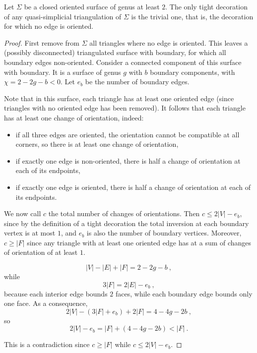 \documentclass[10pt,a4paper]{amsart}
\begin{document}
\begin{lemma}\label{lm:pak}
  Let $\Sigma$ be a closed oriented surface of genus at least $2$. The only tight decoration of any quasi-simplicial triangulation of $\Sigma$ is the trivial one, that is, the decoration for which no edge is oriented.
\end{lemma}

\begin{proof}
  First remove from $\Sigma$ all triangles where no edge is oriented. This leaves a (possibly disconnected) triangulated surface with boundary, for which all boundary edges non-oriented.  Consider a connected component of this surface with boundary. It is a surface of genus $g$ with $b$ boundary components, with $\chi=2-2g-b<0$. Let $e_b$ be the number of boundary edges. 

  Note that in this surface, each triangle has at least one oriented edge (since triangles with no oriented edge has been removed). It follows that each triangle has at least one change of orientation, indeed:
  \begin{itemize}
  \item if all three edges are oriented, the orientation cannot be compatible at all corners, so there is at least one change of orientation,
  \item if exactly one edge is non-oriented, there is half a change of orientation at each of its endpoints,
  \item if exactly one edge is oriented, there is half a change of orientation at each of its endpoints.
  \end{itemize}

  We now call $c$ the total number of changes of orientations. Then $c\leq 2|V|-e_b$, since by the definition of a tight decoration the total inversion at each boundary vertex is at most $1$, and $e_b$ is also the number of boundary vertices. Moreover, $c\geq |F|$ since any triangle with at least one oriented edge has at a sum of changes of orientation of at least $1$. 

  $$ |V|-|E|+|F| = 2-2g-b~, $$
  while
  $$ 3|F| = 2|E|-e_b~, $$
  because each interior edge bounds $2$ faces, while each boundary edge bounds only one face. As a consequence,
  $$ 2|V|-(3|F|+e_b)+2|F| = 4-4g-2b~, $$
  so
  $$ 2|V|-e_b = |F| + (4-4g-2b) < |F|~. $$

  This is a contradiction since $c\geq |F|$ while $c\leq 2|V|-e_b$.  
\end{proof}
\end{document}
